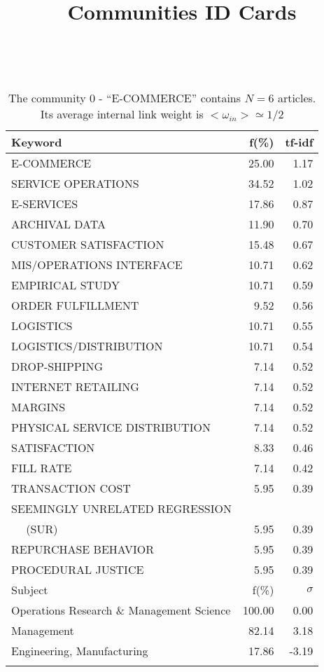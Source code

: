\documentclass[a4paper,11pt]{report}
\title{{\bf Communities ID Cards}}
\date{\begin{flushleft}This document gather the ``ID Cards'' of the CC communities found within your database.\\
 The CC network was built by keeping a link between articles sharing at least 5 references. The communities characterized here correspond to the ones found in the level 1 (in the sense of the Louvain algo) which gathers more than 0 articles.\\
 These ID cards displays the most frequent keywords, subject categories, journals of publication, institution, countries, authors, references and reference journals of the articles of each community. The significance of an item $\sigma = \sqrt{N} (f - p) / \sqrt{p(1-p)}$ [where $N$ is the number of articles within the community and $f$ and $p$ are the proportion of articles respectively within the community and within the database displaying that item ] is also given (for example $\sigma > 5$ is really highly significant). The tf-idf value which can be calculated by $tf-idf = f*log(frac{1}{p})$ is also given.\\
\vspace{1cm}
\copyright Sebastian Grauwin, Liu Weizhi - (2014) \end{flushleft}}
\begin{document}
\begin{landscape}
\maketitle
\clearpage

\begin{table}[!ht]
\caption{The community 0 - ``E-COMMERCE'' contains $N = 6$ articles. Its average internal link weight is $<\omega_{in}> \simeq 1/2$ }
\textcolor{white}{aa}\\
{\scriptsize\begin{tabular}{|l r  r|}
\hline
Keyword & f(\%) & tf-idf \\
\hline
E-COMMERCE & 25.00 & 1.17\\
SERVICE OPERATIONS & 34.52 & 1.02\\
E-SERVICES & 17.86 & 0.87\\
ARCHIVAL DATA & 11.90 & 0.70\\
CUSTOMER SATISFACTION & 15.48 & 0.67\\
MIS/OPERATIONS INTERFACE & 10.71 & 0.62\\
EMPIRICAL STUDY & 10.71 & 0.59\\
ORDER FULFILLMENT & 9.52 & 0.56\\
LOGISTICS & 10.71 & 0.55\\
LOGISTICS/DISTRIBUTION & 10.71 & 0.54\\
DROP-SHIPPING & 7.14 & 0.52\\
INTERNET RETAILING & 7.14 & 0.52\\
MARGINS & 7.14 & 0.52\\
PHYSICAL SERVICE DISTRIBUTION & 7.14 & 0.52\\
SATISFACTION & 8.33 & 0.46\\
FILL RATE & 7.14 & 0.42\\
TRANSACTION COST & 5.95 & 0.39\\
SEEMINGLY UNRELATED REGRESSION &  &\\
$\quad$ (SUR) & 5.95 & 0.39\\
REPURCHASE BEHAVIOR & 5.95 & 0.39\\
PROCEDURAL JUSTICE & 5.95 & 0.39\\
\hline
\hline
Subject & f(\%) & $\sigma$\\
\hline
Operations Research \& Management Science & 100.00 & 0.00\\
Management & 82.14 & 3.18\\
Engineering, Manufacturing & 17.86 & -3.19\\
 &  & \\

\end{tabular}}
\end{table}
\end{landscape}
\end{document}
